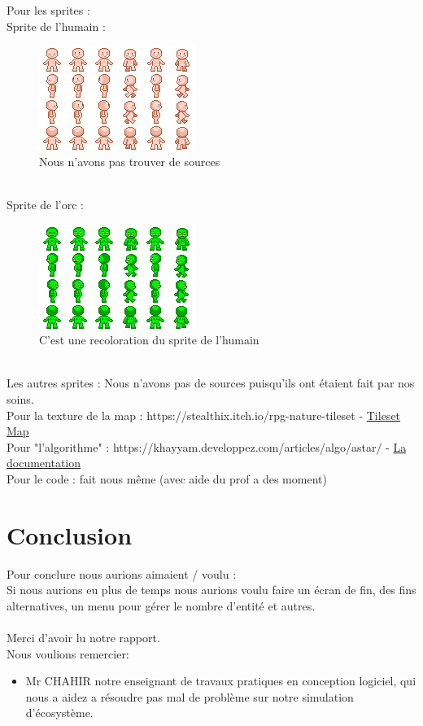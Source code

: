 \documentclass[a4paper, 11pt]{article}
\begin{document}
Pour les sprites : \\
		 Sprite de l'humain :
\begin{figure}[ht!]
 \centering
 \includegraphics[width=0.5\linewidth]{images/human.png}
 \caption{Nous n'avons pas trouver de sources}
 \label{fig::example::one}
\end{figure}
\\
		 Sprite de l'orc :
\begin{figure}[ht!]
 \centering
 \includegraphics[width=0.5\linewidth]{images/orc.png}
 \caption{C'est une recoloration du sprite de l'humain}
 \label{fig::example::one}
\end{figure}
\\
		 Les autres sprites : Nous n'avons pas de sources puisqu'ils ont étaient fait par nos soins.\\
Pour la texture de la map : https://stealthix.itch.io/rpg-nature-tileset  - \href{https://stealthix.itch.io/rpg-nature-tileset}{Tileset Map}\\
Pour "l'algorithme" : https://khayyam.developpez.com/articles/algo/astar/ - \href{https://khayyam.developpez.com/articles/algo/astar/}{La documentation}\\
Pour le code : fait nous même (avec aide du prof a des moment)\\

\newpage

\section{Conclusion}

Pour conclure nous aurions aimaient / voulu :\\
Si nous aurions eu plus de temps nous aurions voulu faire un écran de fin, des fins alternatives, un menu pour gérer le nombre d'entité et autres.\\
\\
Merci d'avoir lu notre rapport.\\
Nous voulions remercier:\\
\begin{itemize}
\item Mr CHAHIR notre enseignant de travaux pratiques en conception logiciel, qui nous a aidez a résoudre pas mal de problème sur notre simulation d'écosystème.
\end{itemize}
\end{document}
